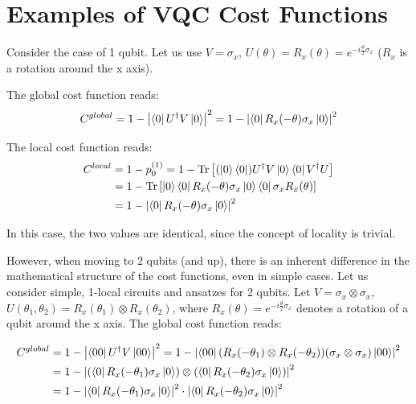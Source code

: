 \documentclass[a4paper,12pt]{article}
\DeclareMathOperator{\tr}{Tr}
\begin{document}
\section{Examples of VQC Cost Functions} \label{app:vqc_cost_example}


Consider the case of 1 qubit. Let us use $V=\sigma_x$, $U(\theta) = R_x(\theta) = e^{-i\frac{\theta}{2}\sigma_x}$ ($R_x$ is a rotation around the x axis).

The global cost function reads:
\begin{equation*}
    C^{global} = 1 - \left| \bra{0} U^\dagger V \ket{0}\right|^2 = 1- \left| \bra{0} R_x(-\theta) \sigma_x \ket{0}\right|^2
\end{equation*}

The local cost function reads:
\begin{align*}
    C^{local} &= 1 - p_0^{(1)} = 1 - \tr\left[ (\ket{0}\bra{0}) U^\dagger V \ket{0}\bra{0} V^\dagger U \right] \\
    &= 1 - \tr\left[ \ket{0}\bra{0} R_x(-\theta) \sigma_x \ket{0}\bra{0} \sigma_x R_x(\theta) \right] \\
    &= 1- \left| \bra{0} R_x(-\theta) \sigma_x \ket{0}\right|^2
\end{align*}

In this case, the two values are identical, since the concept of locality is trivial.


However, when moving to 2 qubits (and up), there is an inherent difference in the mathematical structure of the cost functions, even in simple cases.
Let us consider simple, 1-local circuits and ansatzes for 2 qubits.
Let $V=\sigma_x \otimes \sigma_x$, $U(\theta_1,\theta_2) = R_x(\theta_1) \otimes R_x(\theta_2)$, where $R_x(\theta) = e^{-i\frac{\theta}{2}\sigma_x}$ denotes a rotation of a qubit around the x axis.
The global cost function reads:

\begin{align*}
    C^{global} &= 1 - \left| \bra{00} U^\dagger V \ket{00}\right|^2 = 1- \left| \bra{00} (R_x(-\theta_1) \otimes R_x(-\theta_2)) (\sigma_x \otimes \sigma_x) \ket{00}\right|^2 \\
    &= 1 - \left| \left( \bra{0} R_x(-\theta_1) \sigma_x \ket{0} \right) \otimes \left( \bra{0} R_x(-\theta_2) \sigma_x \ket{0} \right) \right|^2  \\
    &= 1 - \left| \bra{0} R_x(-\theta_1) \sigma_x \ket{0} \right|^2 \cdot \left| \bra{0} R_x(-\theta_2) \sigma_x \ket{0}\right|^2
\end{align*}
\end{document}
